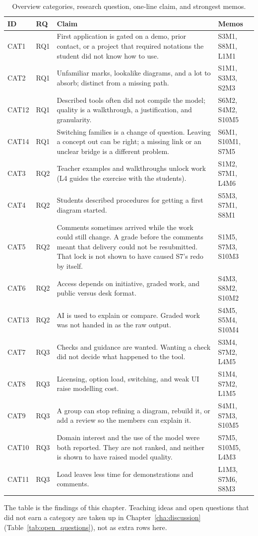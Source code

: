 \begin{table}[p]
\centering
\footnotesize
\setlength{\tabcolsep}{3pt}
\caption{Overview categories, research question, one-line claim, and strongest memos.}
\label{tab:cat_rq_summary}
\begin{tabularx}{\textwidth}{l l >{\raggedright\arraybackslash}p{} l}
\toprule
\textbf{ID} & \textbf{RQ} & \textbf{Claim} & \textbf{Memos} \\
\midrule
CAT1 & RQ1 & First application is gated on a demo, prior contact, or a project that required notations the student did not know how to use. & S3M1, S8M1, L1M1 \\
CAT2 & RQ1 & Unfamiliar marks, lookalike diagrams, and a lot to absorb; distinct from a missing path. & S1M1, S3M3, S2M3 \\
CAT12 & RQ1 & Described tools often did not compile the model; quality is a walkthrough, a justification, and granularity. & S6M2, S4M2, S10M5 \\
CAT14 & RQ1 & Switching families is a change of question. Leaving a concept out can be right; a missing link or an unclear bridge is a different problem. & S6M1, S10M1, S7M5 \\
CAT3 & RQ2 & Teacher examples and walkthroughs unlock work (L4 guides the exercise with the students). & S1M2, S7M1, L4M6 \\
CAT4 & RQ2 & Students described procedures for getting a first diagram started. & S5M3, S7M1, S8M1 \\
CAT5 & RQ2 & Comments sometimes arrived while the work could still change. A grade before the comments meant that delivery could not be resubmitted. That lock is not shown to have caused S7's redo by itself. & S1M5, S7M3, S10M3 \\
CAT6 & RQ2 & Access depends on initiative, graded work, and public versus desk format. & S4M3, S8M2, S10M2 \\
CAT13 & RQ2 & AI is used to explain or compare. Graded work was not handed in as the raw output. & S4M5, S5M4, S10M4 \\
CAT7 & RQ3 & Checks and guidance are wanted. Wanting a check did not decide what happened to the tool. & S3M4, S7M2, L4M5 \\
CAT8 & RQ3 & Licensing, option load, switching, and weak UI raise modelling cost. & S1M4, S7M2, L1M5 \\
CAT9 & RQ3 & A group can stop refining a diagram, rebuild it, or add a review so the members can explain it. & S4M1, S7M3, S10M5 \\
CAT10 & RQ3 & Domain interest and the use of the model were both reported. They are not ranked, and neither is shown to have raised model quality. & S7M5, S10M5, L4M3 \\
CAT11 & RQ3 & Load leaves less time for demonstrations and comments. & L1M3, S7M6, S8M3 \\
\bottomrule
\end{tabularx}
\end{table}

The table is the findings of this chapter. Teaching ideas and open questions that did not earn a category are taken up in Chapter~\ref{cha:discussion} (Table~\ref{tab:open_questions}), not as extra rows here.
